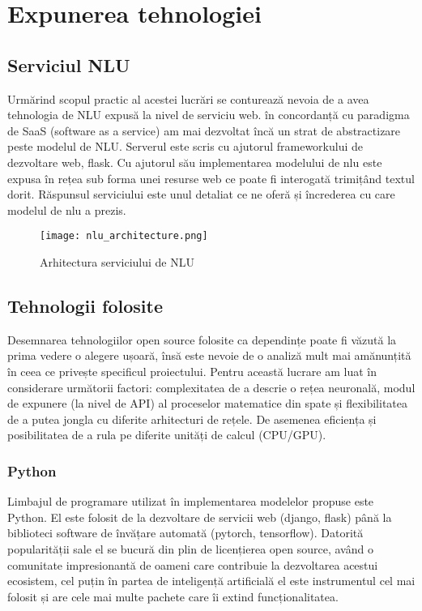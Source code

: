 \chapter{Expunerea tehnologiei}

\section{Serviciul NLU}
Urmărind scopul practic al acestei lucrări se conturează nevoia de a avea tehnologia de NLU expusă la nivel de serviciu web.
în concordanță cu paradigma de SaaS (software as a service) am mai dezvoltat încă un strat de abstractizare peste modelul de NLU.
Serverul este scris cu ajutorul frameworkului de dezvoltare web, flask. Cu ajutorul său implementarea modelului de nlu este expusa în rețea sub forma unei resurse
web ce poate fi interogată trimițând textul dorit.
Răspunsul serviciului este unul detaliat ce ne oferă și încrederea cu care modelul de nlu a prezis.
\begin{figure}[h]
	\texttt{[image: nlu\_architecture.png]}
	\caption{Arhitectura serviciului de NLU}
	\label{fig:nlu_arch}
\end{figure}

\section{Tehnologii folosite}

Desemnarea tehnologiilor open source folosite ca dependințe poate fi văzută la prima vedere o alegere ușoară, însă este nevoie de o analiză mult mai amănunțită în ceea ce privește specificul proiectului.
Pentru această lucrare am luat în considerare următorii factori: complexitatea de a descrie o rețea neuronală, modul de expunere (la nivel de API) al proceselor matematice din spate și flexibilitatea de a putea jongla cu diferite arhitecturi de rețele. De asemenea eficiența și posibilitatea de a rula pe diferite unități de calcul (CPU/GPU).

\subsection{Python}

Limbajul de programare utilizat în implementarea modelelor propuse este Python. El este folosit de la dezvoltare de servicii web (django, flask) până la biblioteci software de învățare automată (pytorch, tensorflow). Datorită popularității sale el se bucură din plin de licențierea open source, având o comunitate impresionantă de oameni care contribuie la dezvoltarea acestui ecosistem, cel puțin în partea de inteligență artificială el este instrumentul cel mai folosit și are cele mai multe pachete care îi extind funcționalitatea. 


